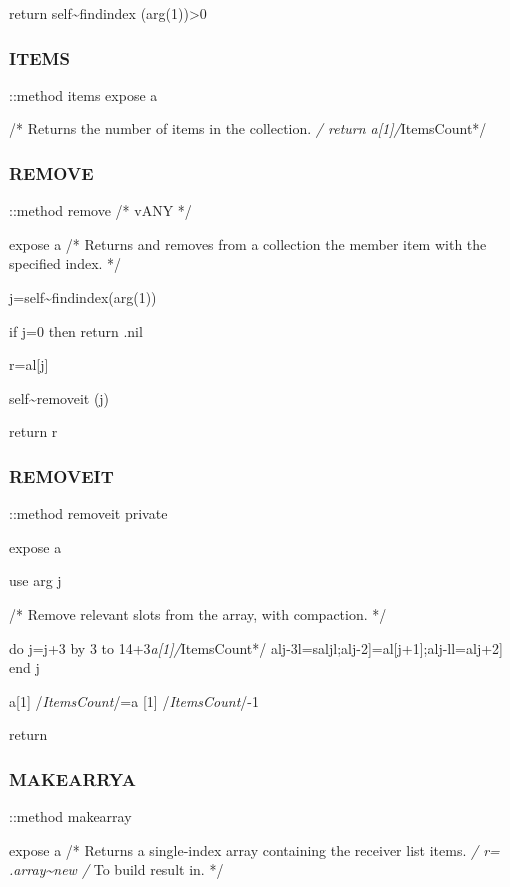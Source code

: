 return self\textasciitilde findindex (arg(1))\textgreater0

\hypertarget{items}{%
\subsubsection{ITEMS}\label{items}}

::method items expose a

/* Returns the number of items in the collection. \emph{/ return
a{[}1{]}/}ItemsCount*/

\hypertarget{remove}{%
\subsubsection{REMOVE}\label{remove}}

::method remove /* vANY */

expose a /* Returns and removes from a collection the member item with
the specified index. */

j=self\textasciitilde findindex(arg(1))

if j=0 then return .nil

r=al{[}j{]}

self\textasciitilde removeit (j)

return r

\hypertarget{removeit}{%
\subsubsection{REMOVEIT}\label{removeit}}

::method removeit private

expose a

use arg j

/* Remove relevant slots from the array, with compaction. */

do j=j+3 by 3 to 14+3\emph{a{[}1{]}/}ItemsCount*/
alj-3l=saljl;alj-2{]}=al{[}j+1{]};alj-ll=alj+2{]} end j

a{[}1{]} /\emph{ItemsCount}/=a {[}1{]} /\emph{ItemsCount}/-1

return

\hypertarget{makearrya}{%
\subsubsection{MAKEARRYA}\label{makearrya}}

::method makearray

expose a /* Returns a single-index array containing the receiver list
items. \emph{/ r= .array\textasciitilde new /} To build result in. */

